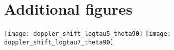 \documentclass[a4paper,fleqn,usenatbib]{mnras}
\newcommand{\tauh}{\ifmmode \tau_{\mathrm{H}}\else $\tau_{\mathrm{H}}$~\fi}
\begin{document}
\appendix

\section{Additional figures}
\label{sec:appendix}

\begin{figure*}
  \begin{center}
    \texttt{[image: doppler\_shift\_logtau5\_theta90]}
    \texttt{[image: doppler\_shift\_logtau7\_theta90]}
  \end{center}
  \caption{\textbf{Qualitative trends of changing outflow and
      rotational velocity.}
    Same layout as Figure \ref{fig:doppler_shift}. On the left:
    $\tauh=10^5$ and $\theta=90^\circ$; on the right:     this time  $\tauh=10^7$ and $\theta=90^\circ$.}
\end{figure*}
\end{document}
